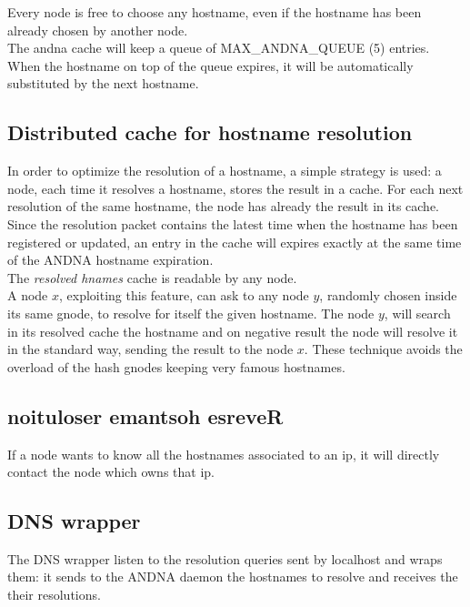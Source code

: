 \documentclass[a4paper]{article}
\begin{document}
Every node is free to choose any hostname, even if the hostname has been
already chosen by another node.\\
The andna cache will keep a queue of MAX\_ANDNA\_QUEUE (5) entries.
When the hostname on top of the queue expires, it will be automatically
substituted by the next hostname.


\subsection{Distributed cache for hostname resolution}

In order to optimize the resolution of a hostname, a simple strategy is
used: a node, each time it resolves a hostname, stores the result in a
cache. For each next resolution of the same hostname, the node has already
the result in its cache.\\
Since the resolution packet contains the latest time when the hostname has
been registered or updated, an entry in the cache will
expires exactly at the same time of the ANDNA hostname expiration.\\

The \emph{resolved hnames} cache is readable by any node.\\
A node $x$, exploiting this feature, can ask to any node $y$, randomly chosen
inside its same gnode, to resolve for itself the given hostname.
The node $y$, will search in its resolved cache the hostname and on negative
result the node will resolve it in the standard way, sending the result to
the node $x$.
These technique avoids the overload of the hash gnodes keeping very famous
hostnames.

\subsection{noituloser emantsoh esreveR}

If a node wants to know all the hostnames associated to an ip, it will
directly contact the node which owns that ip.

\subsection{DNS wrapper}

The DNS wrapper listen to the resolution queries sent by localhost and wraps
them: it sends to the ANDNA daemon the hostnames to resolve and receives 
the their resolutions.\\
\end{document}
